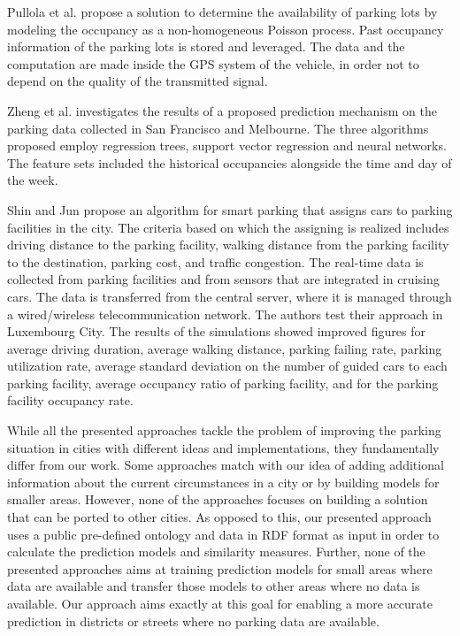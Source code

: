 Pullola et al. \cite{pullola} propose a solution to determine the availability of parking lots by modeling the occupancy as a non-homogeneous Poisson process. Past occupancy information of the parking lots is stored and leveraged. The data and the computation are made inside the GPS system of the vehicle, in order not to depend on the quality of the transmitted signal. 

Zheng et al. \cite{zheng} investigates the results of a proposed prediction mechanism on the parking data collected in San Francisco and Melbourne. The three algorithms proposed employ regression trees, support vector regression and neural networks. The feature sets included the historical occupancies alongside the time and day of the week.

Shin and Jun \cite{shin} propose an algorithm for smart parking that assigns cars to parking facilities in the city. The criteria based on which the assigning is realized includes driving distance to the parking facility, walking distance from the parking facility to the destination, parking cost, and traffic congestion. The real-time data is collected from parking facilities and from sensors that are integrated in cruising cars. The data is transferred from the central server, where it is managed through a wired/wireless telecommunication network. The authors test their approach in Luxembourg City. The results of the simulations showed improved figures for average driving duration, average walking distance, parking failing rate, parking utilization rate, average standard deviation on the number of guided cars to each parking facility, average occupancy ratio of parking facility, and for the parking facility occupancy rate.  

While all the presented approaches tackle the problem of improving the parking situation in cities with different ideas and implementations, they fundamentally differ from our work. 
Some approaches match with our idea of adding additional information about the current circumstances in a city or by building models for smaller areas.
However, none of the approaches focuses on building a solution that can be ported to other cities. 
As opposed to this, our presented approach uses a public pre-defined ontology and data in RDF format as input in order to calculate the prediction models and similarity measures. 
Further, none of the presented approaches aims at training prediction models for small areas where data are available and transfer those models to other areas where no data is available. Our approach aims exactly at this goal for enabling a more accurate prediction in districts or streets where no parking data are available. 

